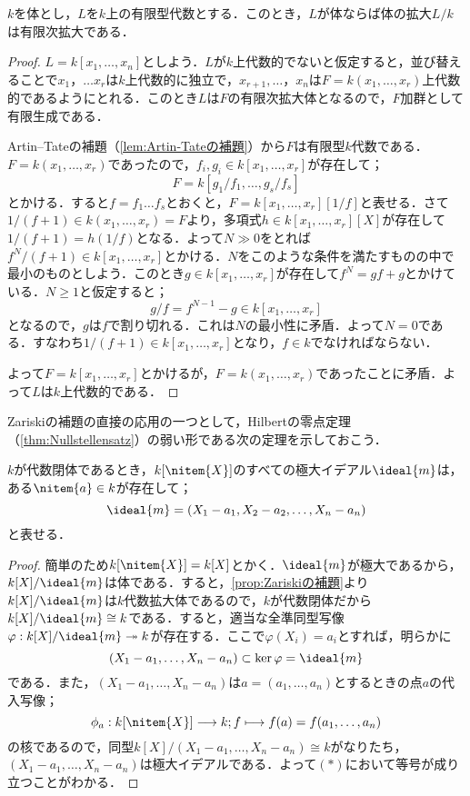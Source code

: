 \begin{prop}[Zariskiの補題]\label{prop:Zariskiの補題}
	$k$を体とし，$L$を$k$上の有限型代数とする．このとき，$L$が体ならば体の拡大$L/k$は有限次拡大である．
\end{prop}

\begin{proof}
	$L=k[x_1,\dots,x_n]$としよう．$L$が$k$上代数的でないと仮定すると，並び替えることで$x_1，\dots x_r$は$k$上代数的に独立で，$x_{r+1},\dots，x_n$は$F=k(x_1,\dots,x_r)$上代数的であるようにとれる．このとき$L$は$F$の有限次拡大体となるので，$F$加群として有限生成である．
	
	Artin--Tateの補題（\ref{lem:Artin-Tateの補題}）から$F$は有限型$k$代数である．$F=k(x_1,\dots,x_r)$であったので，$f_i,g_i\in k[x_1,\dots,x_r]$が存在して；
	\[F=k[g_1/f_1,\dots,g_s/f_s]\]
	とかける．すると$f=f_1\dots f_s$とおくと，$F=k[x_1,\dots,x_r][1/f]$と表せる．さて$1/(f+1)\in k(x_1,\dots,x_r)=F$より，多項式$h\in k[x_1,\dots,x_r][X]$が存在して$1/(f+1)=h(1/f)$となる．よって$N\gg0$をとれば$f^N/(f+1)\in k[x_1,\dots,x_r]$とかける．$N$をこのような条件を満たすものの中で最小のものとしよう．このとき$g\in k[x_1,\dots,x_r]$が存在して$f^N=gf+g$とかけている．$N\geq1$と仮定すると；
	\[g/f=f^{N-1}-g\in k[x_1,\dots,x_r]\]
	となるので，$g$は$f$で割り切れる．これは$N$の最小性に矛盾．よって$N=0$である．すなわち$1/(f+1)\in k[x_1,\dots,x_r]$となり，$f\in k$でなければならない．
	
	よって$F=k[x_1,\dots,x_r]$とかけるが，$F=k(x_1,\dots,x_r)$であったことに矛盾．よって$L$は$k$上代数的である．
\end{proof}

Zariskiの補題の直接の応用の一つとして，Hilbertの零点定理（\ref{thm:Nullstellensatz}）の弱い形である次の定理を示しておこう．

\begin{thm}\label{thm:week nullstellensatz}
	$k$が代数閉体であるとき，$k[\nitem{X}]$のすべての極大イデアル$\ideal{m}$は，ある$\nitem{a}\in k$が存在して；
	\[\ideal{m}=(X_1-a_1,X_2-a_2,\dots,X_n-a_n)\]
	と表せる．
\end{thm}
\begin{proof}
	簡単のため$k[\nitem{X}]=k[X]$とかく．$\ideal{m}$が極大であるから，$k[X]/\ideal{m}$は体である．すると，\ref{prop:Zariskiの補題}より$k[X]/\ideal{m}$は$k$代数拡大体であるので，$k$が代数閉体だから$k[X]/\ideal{m}\cong k$である．すると，適当な全準同型写像$\varphi:k[X]/\ideal{m}\twoheadrightarrow k$が存在する．ここで$\varphi(X_i)=a_i$とすれば，明らかに\displaystar
	\[(X_1-a_1,\dots,X_n-a_n)\subset\ker\varphi=\ideal{m}\]
	である．また，$(X_1-a_1,\dots,X_n-a_n)$は$a=(a_1,\dots,a_n)$とするときの点$a$の代入写像；
	\[\phi_a:k[\nitem{X}]\longrightarrow k;f\longmapsto f(a)=f(a_1,\dots,a_n)\]
	の核であるので，同型$k[X]/(X_1-a_1,\dots,X_n-a_n)\cong k$がなりたち，$(X_1-a_1,\dots,X_n-a_n)$は極大イデアルである．よって$(\ast)$において等号が成り立つことがわかる．
\end{proof}
